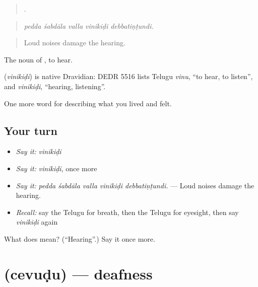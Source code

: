 \begin{quote}
    .
\end{quote}

\begin{quote}
\emph{pedda śabdāla valla vinikiḍi debbatiṇṭundi.}
\end{quote}

\begin{quote}
Loud noises damage the hearing.
\end{quote}

The noun of , to hear.

\begin{cousinweb}
\textbf{} (\emph{vinikiḍi}) is native Dravidian: DEDR 5516 lists Telugu \emph{vinu}, \textquotedblleft{}to hear, to listen\textquotedblright{}, and \emph{vinikiḍi}, \textquotedblleft{}hearing, listening\textquotedblright{}.
\end{cousinweb}

\begin{grammarlens}[title={What you've built}]
One more word for describing what you lived and felt.
\end{grammarlens}

\subsection*{Your turn}
\begin{itemize}
\raggedright
  \item \emph{Say it:} \emph{vinikiḍi}
  \item \emph{Say it:} \emph{vinikiḍi}, once more
  \item \emph{Say it:} \emph{pedda śabdāla valla vinikiḍi debbatiṇṭundi.} — Loud noises damage the hearing.
  \item \emph{Recall:} say the Telugu for breath, then the Telugu for eyesight, then say \emph{vinikiḍi} again
\end{itemize}

\begin{tcolorbox}[breakable,colback=teal!4,colframe=teal!35!black,title={Before you move on}]
What does  mean? (\textquotedblleft{}Hearing\textquotedblright{}.) Say it once more.
\end{tcolorbox}
\section[\texorpdfstring{\te{చెవుడు} (cevuḍu)}{చెవుడు (cevuḍu)}]{ (cevuḍu) — deafness}

